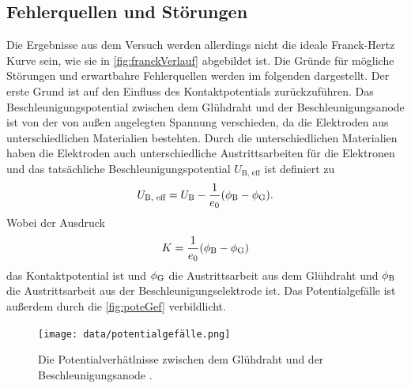 \subsection{Fehlerquellen und Störungen}
\label{subsec:fehlerStoerung}

Die Ergebnisse aus dem Versuch werden allerdings nicht die ideale Franck-Hertz Kurve sein, wie sie in \autoref{fig:franckVerlauf} abgebildet ist. Die Gründe für mögliche Störungen und erwartbahre Fehlerquellen werden im folgenden dargestellt.
Der erste Grund ist auf den Einfluss des Kontaktpotentials zurückzuführen. Das Beschleunigungspotential zwischen dem Glühdraht und der Beschleunigungsanode ist von der von außen angelegten Spannung verschieden, da die Elektroden aus unterschiedlichen Materialien bestehten.
Durch die unterschiedlichen Materialien haben die Elektroden auch unterschiedliche Austrittsarbeiten für die Elektronen und das tatsächliche Beschleunigungspotential $U_{\text {B, eff}}$ ist definiert zu
\begin{align}
    U_{\text {B, eff}} = U_{\text B} - \frac{1}{e_0} (\phi_{\text B} - \phi_{\text G}).
    \label{eqn:potentialGef}
\end{align}
Wobei der Ausdruck
\begin{align}
    K = \frac{1}{e_0} (\phi_{\text B} - \phi_{\text G})
\end{align}
das Kontaktpotential ist und $\phi_{\text G}$ die Austrittsarbeit aus dem Glühdraht und $\phi_{\text B}$ die Austrittsarbeit aus der Beschleunigungselektrode ist.
Das Potentialgefälle ist außerdem durch die \autoref{fig:poteGef} verbildlicht.

\begin{figure}[H]
    \centering
    \texttt{[image: data/potentialgefälle.png]}
    \caption{Die Potentialverhätlnisse zwischen dem Glühdraht und der Beschleunigungsanode \cite{Anleitung601}.}
    \label{fig:poteGef}
\end{figure}

